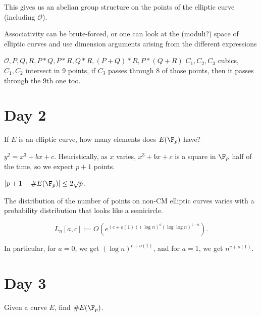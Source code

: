 \documentclass{article}
\begin{document}
\begin{thm}
 This gives us an abelian group structure on the points of the elliptic curve
 (including $\mathcal O$).
\end{thm}

Associativity can be brute-forced, or one can look at the (moduli?) space of
elliptic curves and use dimension arguments arising from the different
expressions

$\mathcal O, P, Q, R, P\ast Q, P\ast R, Q\ast R, (P+Q)\ast R, P\ast(Q+R)$
$C_1,C_2,C_3$ cubics, $C_1,C_2$ intersect in $9$ points, if $C_3$ passes through
$8$ of those points, then it passes through the $9$th one too.

\section{Day 2}
\begin{question}
 If $E$ is an elliptic curve, how many elements does $E(\F_p)$ have? 
\end{question}
$y^2=x^3+bx+c$. Heuristically, as $x$ varies, $x^3+bx+c$ is a square in $\F_p$ half of the
time, so we expect $p+1$ points.

\begin{thm}[Hasse]
   $|p+1-\#E({\F_p})| \leq 2\sqrt p$.
\end{thm}

\begin{thm}
 The distribution of the number of points on non-CM elliptic curves varies with
 a probability distribution that looks like a semicircle.
\end{thm}

\begin{defn}
  $$L_n[a,c] := O(e^{(c+o(1)){(\log n)}^a{(\log \log n)}^{1-a}}).$$
\end{defn}

In particular, for $a=0$, we get ${(\log n)}^{c+o(1)}$, and for $a=1$, we get $n^{c+o(1)}$.

\section{Day 3}
Given a curve $E$, find $\#E(\F_p)$.
\end{document}
